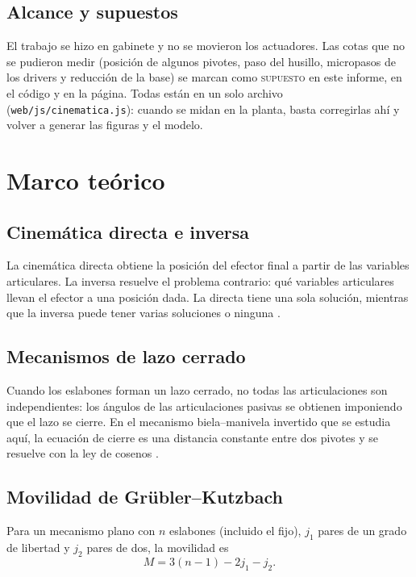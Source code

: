 \documentclass[a4paper,12pt]{article}
\newcommand{\supuesto}{\textcolor{naranja}{\textsc{supuesto}}}
\newcommand{\codigo}[1]{\texttt{\small #1}}
\begin{document}
\subsection{Alcance y supuestos}
El trabajo se hizo en gabinete y no se movieron los actuadores. Las cotas que no se pudieron medir
(posición de algunos pivotes, paso del husillo, micropasos de los drivers y reducción de la base) se
marcan como \supuesto{} en este informe, en el código y en la página. Todas están en un solo archivo
(\codigo{web/js/cinematica.js}): cuando se midan en la planta, basta corregirlas ahí y volver a generar las
figuras y el modelo.

\section{Marco teórico}

\subsection{Cinemática directa e inversa}
La cinemática directa obtiene la posición del efector final a partir de las variables articulares. La
inversa resuelve el problema contrario: qué variables articulares llevan el efector a una posición dada.
La directa tiene una sola solución, mientras que la inversa puede tener varias soluciones o ninguna
\cite{craig,spong}.

\subsection{Mecanismos de lazo cerrado}
Cuando los eslabones forman un lazo cerrado, no todas las articulaciones son independientes: los ángulos de
las articulaciones pasivas se obtienen imponiendo que el lazo se cierre. En el mecanismo biela--manivela
invertido que se estudia aquí, la ecuación de cierre es una distancia constante entre dos pivotes y se
resuelve con la ley de cosenos \cite{norton}.

\subsection{Movilidad de Grübler--Kutzbach}
Para un mecanismo plano con $n$ eslabones (incluido el fijo), $j_1$ pares de un grado de libertad y $j_2$
pares de dos, la movilidad es
\begin{equation}
M = 3(n-1) - 2j_1 - j_2 .
\end{equation}
\end{document}
